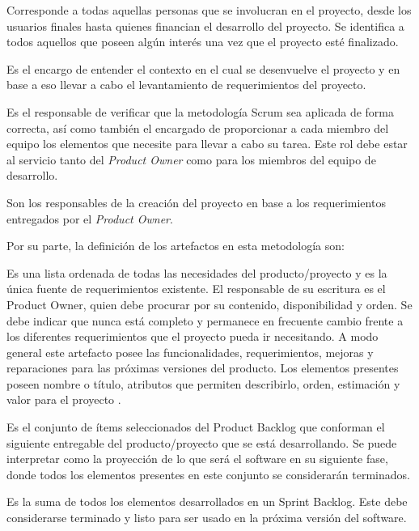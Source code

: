 \begin{description}[leftmargin=10em,style=nextline]
  \item[1. \textit{Stakeholder}] Corresponde a todas aquellas personas que se involucran en el proyecto, desde los usuarios finales hasta quienes financian el desarrollo del proyecto. Se identifica a todos aquellos que poseen algún interés una vez que el proyecto esté finalizado.
  \item[2. \textit{Product Owner}] Es el encargo de entender el contexto en el cual se desenvuelve el proyecto y en base a eso llevar a cabo el levantamiento de requerimientos del proyecto.
  \item[3. \textit{Scrum Master}] Es el responsable de verificar que la metodología Scrum sea aplicada de forma correcta, así como también el encargado de proporcionar a cada miembro del equipo los elementos que necesite para llevar a cabo su tarea. Este rol debe estar al servicio tanto del \textit{Product Owner} como para los miembros del equipo de desarrollo.
  \item[4. \textit{Development Team}] Son los responsables de la creación del proyecto en base a los requerimientos entregados por el \textit{Product Owner}.
\end{description}

Por su parte, la definición de los artefactos en esta metodología son:

\begin{description}[leftmargin=10em,style=nextline]
  \item[1. \textit{Product Backlog}] Es una lista ordenada de todas las necesidades del producto/proyecto y es la única fuente de requerimientos existente. El responsable de su escritura es el Product Owner, quien debe procurar por su contenido, disponibilidad y orden. Se debe indicar que nunca está completo y permanece en frecuente cambio frente a los diferentes requerimientos que el proyecto pueda ir necesitando. A modo general este artefacto posee las funcionalidades, requerimientos, mejoras y reparaciones para las próximas versiones del producto. Los elementos presentes poseen nombre o título, atributos que permiten describirlo, orden, estimación y valor para el proyecto \cite{scrum_guide}.
  \item[2. \textit{Sprint Backlog}] Es el conjunto de ítems seleccionados del Product Backlog que conforman el siguiente entregable del producto/proyecto que se está desarrollando. Se puede interpretar como la proyección de lo que será el software en su siguiente fase, donde todos los elementos presentes en este conjunto se considerarán terminados.
  \item[3. \textit{Increment}] Es la suma de todos los elementos desarrollados en un Sprint Backlog. Este debe considerarse terminado y listo para ser usado en la próxima versión del software.
\end{description}

